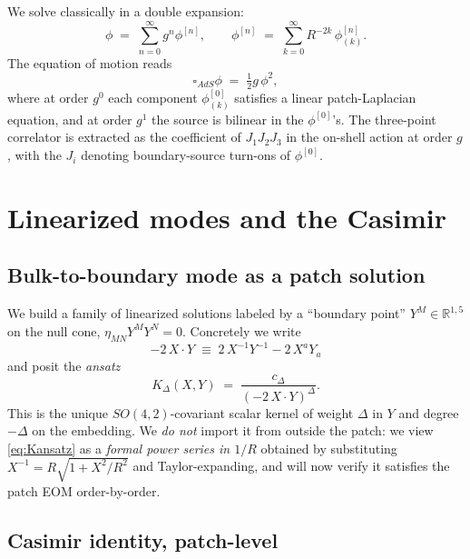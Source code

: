 \documentclass[11pt]{article}
\renewcommand{\Box}{\square}
\begin{document}
We solve classically in a double expansion:
\begin{equation}
    \phi \;=\; \sum_{n=0}^{\infty} g^n \phi^{[n]},\qquad \phi^{[n]} \;=\; \sum_{k=0}^{\infty} R^{-2k}\,\phi^{[n]}_{(k)}.
\end{equation}
The equation of motion reads
\begin{equation}
    \Box_{AdS}\phi \;=\; \tfrac12 g\,\phi^2,
\end{equation}
where at order $g^0$ each component $\phi^{[0]}_{(k)}$ satisfies a linear patch-Laplacian equation, and at order $g^1$ the source is bilinear in the $\phi^{[0]}$'s. The three-point correlator is extracted as the coefficient of $J_1 J_2 J_3$ in the on-shell action at order $g$, with the $J_i$ denoting boundary-source turn-ons of $\phi^{[0]}$.

\section{Linearized modes and the Casimir}\label{sec:mode}

\subsection{Bulk-to-boundary mode as a patch solution}

We build a family of linearized solutions labeled by a ``boundary point'' $Y^M\in\mathbb{R}^{1,5}$ on the null cone, $\eta_{MN}Y^MY^N=0$. Concretely we write
\begin{equation}
    -2\,X\cdot Y \;\equiv\; 2\,X^{-1} Y^{-1} - 2\,X^a Y_a
\end{equation}
and posit the \emph{ansatz}
\begin{equation}
    K_\Delta(X,Y) \;=\; \frac{c_\Delta}{(-2\,X\cdot Y)^{\Delta}}.
    \label{eq:Kansatz}
\end{equation}
This is the unique $SO(4,2)$-covariant scalar kernel of weight $\Delta$ in $Y$ and degree $-\Delta$ on the embedding. We \emph{do not} import it from outside the patch: we view \cref{eq:Kansatz} as a \emph{formal power series in $1/R$} obtained by substituting $X^{-1} = R\sqrt{1+X^2/R^2}$ and Taylor-expanding, and will now verify it satisfies the patch EOM order-by-order.

\subsection{Casimir identity, patch-level}
\end{document}
